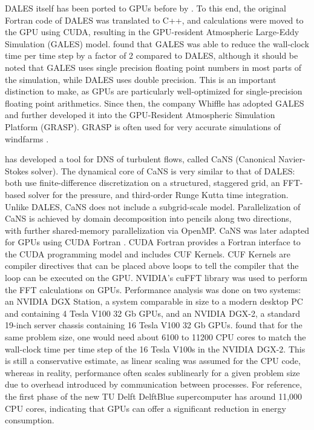 DALES itself has been ported to GPUs before by \citet{schalkwijkHighPerformanceSimulationsTurbulent2012}. To this end, the original Fortran code of DALES was translated to C++, and calculations were moved to the GPU using CUDA, resulting in the GPU-resident Atmospheric Large-Eddy Simulation (GALES) model. \citet{schalkwijkHighPerformanceSimulationsTurbulent2012} found that GALES was able to reduce the wall-clock time per time step by a factor of 2 compared to DALES, although it should be noted that GALES uses single precision floating point numbers in most parts of the simulation, while DALES uses double precision. This is an important distinction to make, as GPUs are particularly well-optimized for single-precision floating point arithmetics. Since then, the company Whiffle has adopted GALES and further developed it into the GPU-Resident Atmospheric Simulation Platform (GRASP). GRASP is often used for very accurate simulations of windfarms \citep{verzijlberghAtmosphericFlowsLarge2021}.

\citet{costaFFTbasedFinitedifferenceSolver2018} has developed a tool for DNS of turbulent flows, called CaNS (Canonical Navier-Stokes solver). The dynamical core of CaNS is very similar to that of DALES: both use finite-difference discretization on a structured, staggered grid, an FFT-based solver for the pressure, and third-order Runge Kutta time integration. Unlike DALES, CaNS does not include a subgrid-scale model. Parallelization of CaNS is achieved by domain decomposition into pencils along two directions, with further shared-memory parallelization via OpenMP.
CaNS was later adapted for GPUs using CUDA Fortran \citep{costaGPUAccelerationCaNS2021}. CUDA Fortran provides a Fortran interface to the CUDA programming model and includes CUF Kernels. CUF Kernels are compiler directives that can be placed above loops to tell the compiler that the loop can be executed on the GPU. NVIDIA's cuFFT library was used to perform the FFT calculations on GPUs. Performance analysis was done on two systems: an NVIDIA DGX Station, a system comparable in size to a modern desktop PC and containing 4 Tesla V100 32 Gb GPUs, and an NVIDIA DGX-2, a standard 19-inch server chassis containing 16 Tesla V100 32 Gb GPUs. \citet{costaGPUAccelerationCaNS2021} found that for the same problem size, one would need about 6100 to 11200 CPU cores to match the wall-clock time per time step of the 16 Tesla V100s in the NVIDIA DGX-2. This is still a conservative estimate, as linear scaling was assumed for the CPU code, whereas in reality, performance often scales sublinearly for a given problem size due to overhead introduced by communication between processes. For reference, the first phase of the new TU Delft DelftBlue supercomputer has around 11,000 CPU cores, indicating that GPUs can offer a significant reduction in energy consumption.
